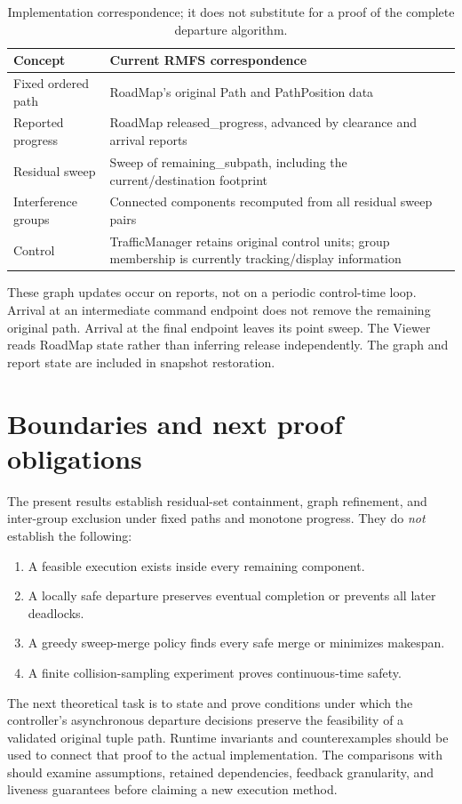 \documentclass[11pt,a4paper]{article}
\theoremstyle{remark}
\begin{document}
\begin{table}[htbp]
\centering\small
\begin{tabular}{p{.27\linewidth}p{.65\linewidth}}
\toprule
Concept & Current RMFS correspondence \\
\midrule
Fixed ordered path & RoadMap's original Path and PathPosition data \\
Reported progress & RoadMap released\_progress, advanced by clearance and arrival reports \\
Residual sweep & Sweep of remaining\_subpath, including the current/destination footprint \\
Interference groups & Connected components recomputed from all residual sweep pairs \\
Control & TrafficManager retains original control units; group membership is currently tracking/display information \\
\bottomrule
\end{tabular}
\caption{Implementation correspondence; it does not substitute for a proof
of the complete departure algorithm.}
\label{tab:implementation}
\end{table}

These graph updates occur on reports, not on a periodic control-time loop.
Arrival at an intermediate command endpoint does not remove the remaining
original path. Arrival at the final endpoint leaves its point sweep.
The Viewer reads RoadMap state rather than inferring release independently.
The graph and report state are included in snapshot restoration.

\section{Boundaries and next proof obligations}

The present results establish residual-set containment, graph refinement,
and inter-group exclusion under fixed paths and monotone progress. They
do \emph{not} establish the following:
\begin{enumerate}
\item A feasible execution exists inside every remaining component.
\item A locally safe departure preserves eventual completion or prevents
      all later deadlocks.
\item A greedy sweep-merge policy finds every safe merge or minimizes makespan.
\item A finite collision-sampling experiment proves continuous-time safety.
\end{enumerate}
The next theoretical task is to state and prove conditions under which the
controller's asynchronous departure decisions preserve the feasibility of a
validated original tuple path. Runtime invariants and counterexamples should
be used to connect that proof to the actual implementation.
The comparisons with~\cite{cap2016,hoenig2019} should examine assumptions,
retained dependencies, feedback granularity, and liveness guarantees before
claiming a new execution method.
\end{document}

